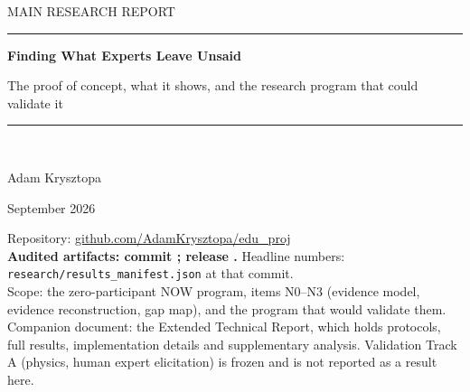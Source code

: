\documentclass[a4paper,11pt]{scrartcl}
\newcommand{\reporttitle}{Finding What Experts Leave Unsaid}
\newcommand{\reportsubtitle}{The proof of concept, what it shows, and the research program that
  could validate it}
\newcommand{\reportauthor}{Adam Krysztopa}
\newcommand{\reportdate}{September 2026}
\begin{document}
\begin{titlepage}
  \sffamily
  \begin{flushleft}
    \color{gray700}\small\MakeUppercase{Main Research Report}\\[10mm]
  \end{flushleft}
  \vspace{0.08\textheight}
  \noindent\textcolor{accent}{\rule{\linewidth}{1.4pt}}\par
  \vspace{6mm}
  {\raggedright{}
   \bfseries\fontsize{30}{36}\selectfont\color{ink}\reporttitle\par}
  \vspace{4mm}
  {\raggedright{}
   \fontsize{14}{18}\selectfont\color{gray700}\reportsubtitle\par}
  \vspace{6mm}
  \textcolor{accent}{\rule{\linewidth}{1.4pt}}\\[10mm]
  \vfill
  \begin{flushleft}
    {\large\reportauthor\par}
    \vspace{1mm}
    {\color{gray700}\reportdate\par}
    \vspace{6mm}
    {\small\color{gray700}
      Repository: \href{https://github.com/AdamKrysztopa/edu_proj}{github.com/AdamKrysztopa/edu\_proj}\\
      \textbf{Audited artifacts: commit
      \href{https://github.com/AdamKrysztopa/edu_proj/tree/\auditcommit}{\texttt{\auditshort}};
      release \href{https://github.com/AdamKrysztopa/edu_proj/releases/tag/\reporelease}{\texttt{\reporelease}}.}
      Headline numbers: \texttt{research/results\_manifest.json} at that commit.\\
      Scope: the zero-participant NOW program, items N0--N3 (evidence model,
      evidence reconstruction, gap map), and the program that would validate them.\\
      Companion document: the Extended Technical Report, which holds protocols, full results,
      implementation details and supplementary analysis. Validation Track A (physics, human expert
      elicitation) is frozen and is not reported as a result here.\par}
  \end{flushleft}
\end{titlepage}
\end{document}
